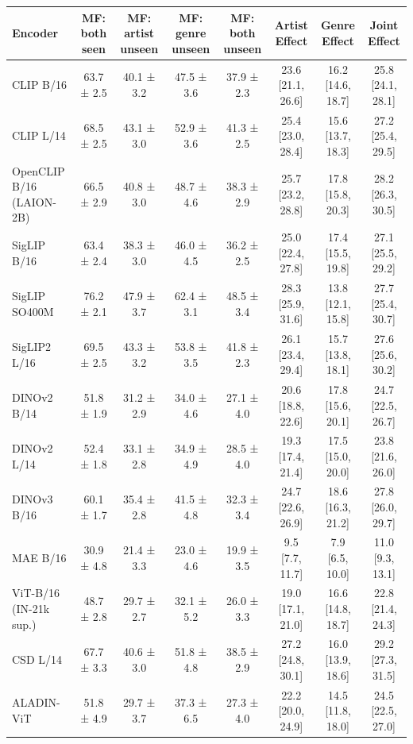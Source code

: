 \begin{tabular}{lccccccc}
\toprule
Encoder & MF: both seen & MF: artist unseen & MF: genre unseen & MF: both unseen & Artist Effect & Genre Effect & Joint Effect \\
\midrule
CLIP B/16 & 63.7 ± 2.5 & 40.1 ± 3.2 & 47.5 ± 3.6 & 37.9 ± 2.3 & 23.6 [21.1, 26.6] & 16.2 [14.6, 18.7] & 25.8 [24.1, 28.1] \\
CLIP L/14 & 68.5 ± 2.5 & 43.1 ± 3.0 & 52.9 ± 3.6 & 41.3 ± 2.5 & 25.4 [23.0, 28.4] & 15.6 [13.7, 18.3] & 27.2 [25.4, 29.5] \\
OpenCLIP B/16 (LAION-2B) & 66.5 ± 2.9 & 40.8 ± 3.0 & 48.7 ± 4.6 & 38.3 ± 2.9 & 25.7 [23.2, 28.8] & 17.8 [15.8, 20.3] & 28.2 [26.3, 30.5] \\
SigLIP B/16 & 63.4 ± 2.4 & 38.3 ± 3.0 & 46.0 ± 4.5 & 36.2 ± 2.5 & 25.0 [22.4, 27.8] & 17.4 [15.5, 19.8] & 27.1 [25.5, 29.2] \\
SigLIP SO400M & 76.2 ± 2.1 & 47.9 ± 3.7 & 62.4 ± 3.1 & 48.5 ± 3.4 & 28.3 [25.9, 31.6] & 13.8 [12.1, 15.8] & 27.7 [25.4, 30.7] \\
SigLIP2 L/16 & 69.5 ± 2.5 & 43.3 ± 3.2 & 53.8 ± 3.5 & 41.8 ± 2.3 & 26.1 [23.4, 29.4] & 15.7 [13.8, 18.1] & 27.6 [25.6, 30.2] \\
DINOv2 B/14 & 51.8 ± 1.9 & 31.2 ± 2.9 & 34.0 ± 4.6 & 27.1 ± 4.0 & 20.6 [18.8, 22.6] & 17.8 [15.6, 20.1] & 24.7 [22.5, 26.7] \\
DINOv2 L/14 & 52.4 ± 1.8 & 33.1 ± 2.8 & 34.9 ± 4.9 & 28.5 ± 4.0 & 19.3 [17.4, 21.4] & 17.5 [15.0, 20.0] & 23.8 [21.6, 26.0] \\
DINOv3 B/16 & 60.1 ± 1.7 & 35.4 ± 2.8 & 41.5 ± 4.8 & 32.3 ± 3.4 & 24.7 [22.6, 26.9] & 18.6 [16.3, 21.2] & 27.8 [26.0, 29.7] \\
MAE B/16 & 30.9 ± 4.8 & 21.4 ± 3.3 & 23.0 ± 4.6 & 19.9 ± 3.5 & 9.5 [7.7, 11.7] & 7.9 [6.5, 10.0] & 11.0 [9.3, 13.1] \\
ViT-B/16 (IN-21k sup.) & 48.7 ± 2.8 & 29.7 ± 2.7 & 32.1 ± 5.2 & 26.0 ± 3.3 & 19.0 [17.1, 21.0] & 16.6 [14.8, 18.7] & 22.8 [21.4, 24.3] \\
CSD L/14 & 67.7 ± 3.3 & 40.6 ± 3.0 & 51.8 ± 4.8 & 38.5 ± 2.9 & 27.2 [24.8, 30.1] & 16.0 [13.9, 18.6] & 29.2 [27.3, 31.5] \\
ALADIN-ViT & 51.8 ± 4.9 & 29.7 ± 3.7 & 37.3 ± 6.5 & 27.3 ± 4.0 & 22.2 [20.0, 24.9] & 14.5 [11.8, 18.0] & 24.5 [22.5, 27.0] \\
\bottomrule
\end{tabular}
